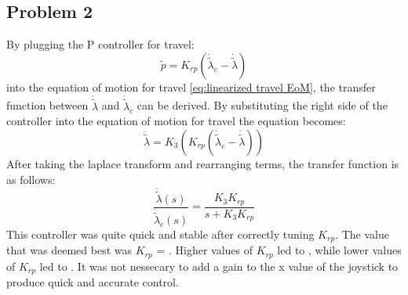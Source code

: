 \subsection{Problem 2}
By plugging the P controller for travel: 
\begin{equation}
\label{travel P controller}
	\tilde{p} = K_{rp}(\dot{\tilde{\lambda}}_c - \dot{\tilde{\lambda}})
\end{equation}
into the equation of motion for travel \cref{eq:linearized travel EoM}, the transfer function between $\dot{\tilde{\lambda}}$ and $\dot{\tilde{\lambda}}_c$  can be derived. By substituting the right side of the controller into the equation of motion for travel the equation becomes:
\begin{equation}
\label{eq:p controller in travel EoM}
	\ddot{\tilde{\lambda}} = K_3(K_{rp}(\dot{\tilde{\lambda}}_c - \dot{\tilde{\lambda}}))
\end{equation}
After taking the laplace transform and rearranging terms, the transfer function is as follows:
\begin{equation}
\label{eq:Transfer function between travel and desired travel}
	\frac{\dot{\tilde{\lambda}}(s)}{\dot{\tilde{\lambda}}_c(s)} = \frac{K_3K_{rp}}{s + K_3K_{rp}}
\end{equation}
This controller was quite quick and stable after correctly tuning $K_{rp}$. The value that was deemed best was $K_{rp}$ = . Higher values of $K_{rp}$ led to , while lower values of $K_{rp}$ led to .  It was not nessecary to add a gain to the x value of the joystick to produce quick and accurate control.


